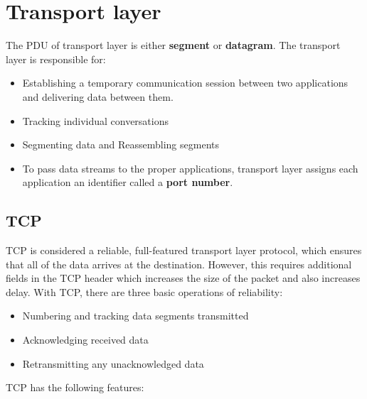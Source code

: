 \tableEnd

\section{Transport layer}

The PDU of transport layer is either \textbf{segment} or \textbf{datagram}. The transport layer is responsible for:

\begin{itemize}
\item Establishing a temporary communication session between two applications and delivering data between them. 
\item Tracking individual conversations
\item Segmenting data and Reassembling segments
\item To pass data streams to the proper applications, transport layer assigns each application an identifier called a \textbf{port number}. 
\end{itemize}

\subsection{TCP}

TCP is considered a reliable, full-featured transport layer protocol, which ensures that all of the data arrives at the destination. However, this requires additional fields in the TCP header which increases the size of the packet and also increases delay. With TCP, there are three basic operations of reliability:

\begin{itemize}
\item Numbering and tracking data segments transmitted 
\item Acknowledging received data
\item Retransmitting any unacknowledged data 
\end{itemize}

TCP has the following features:

